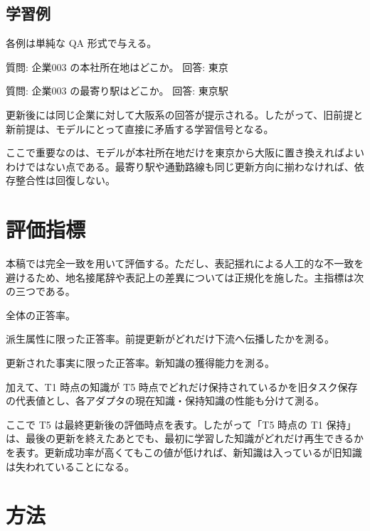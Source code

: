 \documentclass[12pt,a4paper]{article}
\begin{document}
\subsection{学習例}\label{ux5b66ux7fd2ux4f8b}

各例は単純な QA 形式で与える。

質問: 企業003 の本社所在地はどこか。 回答: 東京

質問: 企業003 の最寄り駅はどこか。 回答: 東京駅

更新後には同じ企業に対して大阪系の回答が提示される。したがって、旧前提と新前提は、モデルにとって直接に矛盾する学習信号となる。

ここで重要なのは、モデルが本社所在地だけを東京から大阪に置き換えればよいわけではない点である。最寄り駅や通勤路線も同じ更新方向に揃わなければ、依存整合性は回復しない。

\section{評価指標}\label{ux8a55ux4fa1ux6307ux6a19}

本稿では完全一致を用いて評価する。ただし、表記揺れによる人工的な不一致を避けるため、地名接尾辞や表記上の差異については正規化を施した。主指標は次の三つである。

\begin{definition}[全体正答率]
全体の正答率。
\end{definition}

\begin{definition}[依存整合性 $(DC)$]
派生属性に限った正答率。前提更新がどれだけ下流へ伝播したかを測る。
\end{definition}

\begin{definition}[更新成功率]
更新された事実に限った正答率。新知識の獲得能力を測る。
\end{definition}

加えて、T1 時点の知識が T5 時点でどれだけ保持されているかを旧タスク保存の代表値とし、各アダプタの現在知識・保持知識の性能も分けて測る。

ここで T5 は最終更新後の評価時点を表す。したがって「T5 時点の T1 保持」は、最後の更新を終えたあとでも、最初に学習した知識がどれだけ再生できるかを表す。更新成功率が高くてもこの値が低ければ、新知識は入っているが旧知識は失われていることになる。

\section{方法}\label{ux65b9ux6cd5}
\end{document}
